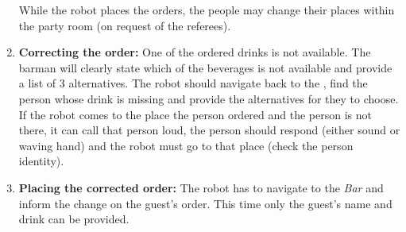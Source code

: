 \begin{enumerate}
	While the robot places the orders, the people may change their places within the party room (on request of the referees).

	\item \textbf{Correcting the order:} One of the ordered drinks is not available. The barman will clearly state which of the beverages is not available and provide a list of 3 alternatives. The robot should navigate back to the , find the person whose drink is missing and provide the alternatives for they to choose.\\

	If the robot comes to the place the person ordered and the person is not there, it can call that person loud, the person should respond (either sound or waving hand) and the robot must go to that place (check the person identity).

	\item \textbf{Placing the corrected order:} The robot has to navigate to the \textit{Bar} and inform the change on the guest's order. This time only the guest's name and drink can be provided.
\end{enumerate}

